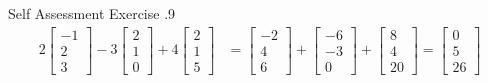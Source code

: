 \documentclass[../notes.tex]{subfiles}
\begin{document}
				\begin{exercise}{Self Assessment Exercise \thechapter.9}
					\begin{align*}
						2\begin{bmatrix}
							-1 \\ 2 \\ 3
						\end{bmatrix} - 3 \begin{bmatrix}
							2 \\ 1 \\ 0
						\end{bmatrix} + 4 \begin{bmatrix}
							2 \\ 1 \\ 5
						\end{bmatrix} &= \begin{bmatrix}
							-2 \\ 4 \\ 6
						\end{bmatrix} + \begin{bmatrix}
							-6 \\ -3 \\ 0
						\end{bmatrix} + \begin{bmatrix}
							8 \\ 4 \\ 20
						\end{bmatrix} = \begin{bmatrix}
							0 \\ 5 \\ 26
						\end{bmatrix}
					\end{align*}
				\end{exercise}
			\pagebreak
\end{document}
